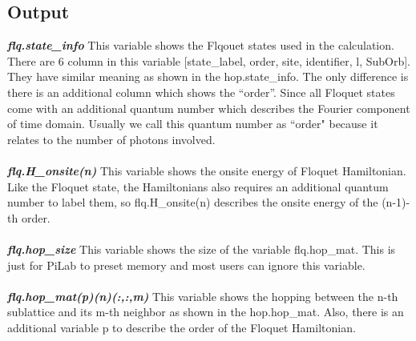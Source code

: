 \documentclass[10pt,a4paper]{article}
\begin{document}
\subsection{Output}
\textit{\textbf{flq.state\_info}} This variable shows the Flqouet states used in the calculation. There are 6 column in this variable [state\_label, order, site, identifier, l, SubOrb]. They have similar meaning as shown in the hop.state\_info. The only difference is there is an additional column which shows the ``order''. Since all Floquet states come with an additional quantum number which describes the Fourier component of time domain. Usually we call this quantum number as ``order" because it relates to the number of photons involved. \\ \\
\textit{\textbf{flq.H\_onsite(n)}} This variable shows the onsite energy of Floquet Hamiltonian. Like the Floquet state, the Hamiltonians also requires an additional quantum number to label them, so flq.H\_onsite(n) describes the onsite energy of the (n-1)-th order. \\ \\
\textit{\textbf{flq.hop\_size}} This variable shows the size of the variable flq.hop\_mat. This is just for PiLab to preset memory and most users can ignore this variable. \\ \\
\textit{\textbf{flq.hop\_mat(p)(n)(:,:,m)}} This variable shows the hopping between the n-th sublattice and its m-th neighbor as shown in the hop.hop\_mat. Also, there is an additional variable p to describe the order of the Floquet Hamiltonian.  \\ \\
\end{document}
